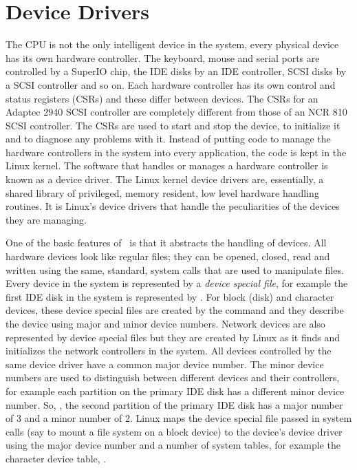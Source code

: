 \chapter{Device Drivers}
\label{dd-chapter}

The CPU is not the only intelligent device in the system, every physical
device has its own hardware controller.  The keyboard, mouse and serial ports
are controlled by a SuperIO chip, the IDE disks by an IDE controller, SCSI disks by a SCSI
controller and so on.
Each hardware controller has its own control and status registers (CSRs)
and these differ between devices.
The CSRs for an Adaptec 2940 SCSI controller are completely different from 
those of an NCR 810 SCSI controller.
The CSRs are used to start and stop the device, to initialize it and to diagnose
any problems with it.
Instead of putting code to manage the hardware controllers in the 
system into every application, the code is kept in the Linux kernel.
The software that handles or manages a hardware controller is known as a device
driver.
The Linux kernel device drivers are, essentially, a shared library of privileged,
memory resident, low level hardware handling routines.
It is Linux's device drivers that handle the peculiarities of the devices they
are managing.

One of the basic features of \unix\ is that it abstracts the handling of devices.
All hardware devices look like regular files; they can be opened, closed, read and
written using the same, standard, system calls that are used to manipulate files.
Every device in the system is represented  by a {\em device special file}, for example the first
IDE disk in the system is represented  by .
For block (disk) and character devices, these device special files are created by the  command 
and they describe the device using major and minor device numbers.
Network devices are also represented by device special files but they are created by Linux as it finds and
initializes the network controllers in the system.
All devices controlled by the same device driver have a common major device number.
The minor device numbers are used to distinguish between different devices and their
controllers, for example each partition on the primary IDE disk has a different minor device number.
So, , the second partition of the primary IDE disk has a major number of 3 and 
a minor number of 2.
Linux maps the device special file passed in system calls (say to mount a file system on a 
block device) to the device's device driver using the major device number and a number of system tables, for example
the character device table,  .

